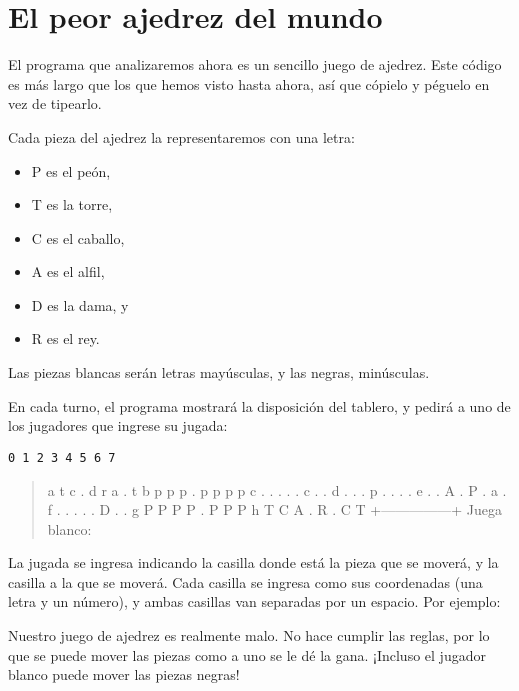 \section{El peor ajedrez del mundo}

El programa que analizaremos ahora es un sencillo juego de ajedrez. Este
código es más largo que los que hemos visto hasta ahora, así que cópielo
y péguelo en vez de tipearlo.

Cada pieza del ajedrez la representaremos con una letra:

\begin{itemize}
\item
  P es el peón,
\item
  T es la torre,
\item
  C es el caballo,
\item
  A es el alfil,
\item
  D es la dama, y
\item
  R es el rey.
\end{itemize}

Las piezas blancas serán letras mayúsculas, y las negras, minúsculas.

En cada turno, el programa mostrará la disposición del tablero, y pedirá
a uno de los jugadores que ingrese su jugada:

\begin{lstlisting}
0 1 2 3 4 5 6 7
\end{lstlisting}

\begin{quote}
{%
}
{%
\FL
\LL
}
\end{quote}

\begin{quote}
a \textbar{}t c . d r a . t\textbar{} b \textbar{}p p p . p p p
p\textbar{} c \textbar{}. . . . . c . .\textbar{} d \textbar{}. . . p .
. . .\textbar{} e \textbar{}. . A . P . a .\textbar{} f \textbar{}. . .
. . D . .\textbar{} g \textbar{}P P P P . P P P\textbar{} h \textbar{}T
C A . R . C T\textbar{} +---------------+ Juega blanco:
\end{quote}

La jugada se ingresa indicando la casilla donde está la pieza que se
moverá, y la casilla a la que se moverá. Cada casilla se ingresa como
sus coordenadas (una letra y un número), y ambas casillas van separadas
por un espacio. Por ejemplo:

Nuestro juego de ajedrez es realmente malo. No hace cumplir las reglas,
por lo que se puede mover las piezas como a uno se le dé la gana.
¡Incluso el jugador blanco puede mover las piezas negras!

